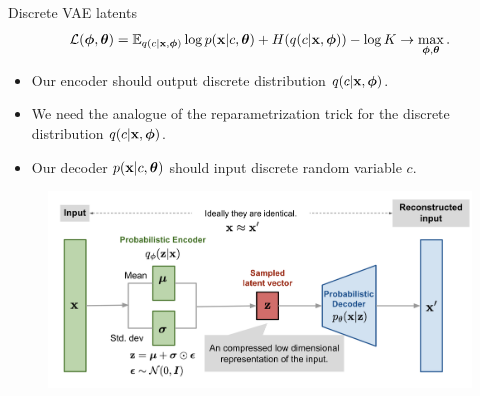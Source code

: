 \begin{frame}{Discrete VAE latents}
	\vspace{-0.3cm}
	\[
		\mathcal{L} (\boldsymbol{\phi}, \boldsymbol{\theta})  = \mathbb{E}_{q(c | \mathbf{x}, \boldsymbol{\phi})} \log p(\mathbf{x} | c, \boldsymbol{\theta}) + H(q(c | \mathbf{x}, \boldsymbol{\phi})) - \log K \rightarrow \max_{\boldsymbol{\phi}, \boldsymbol{\theta}}.
	\]
	\vspace{-0.3cm}
	\begin{itemize}
		\item Our encoder should output discrete distribution $q(c | \mathbf{x}, \boldsymbol{\phi})$.
		\item We need the analogue of the reparametrization trick for the discrete distribution $q(c | \mathbf{x}, \boldsymbol{\phi})$.
		\item Our decoder $p(\mathbf{x} | c, \boldsymbol{\theta})$ should input discrete random variable $c$.
	\end{itemize}
	\begin{figure}[h]
		\centering
		\includegraphics[width=0.9\linewidth]{figs/vae-gaussian}
	\end{figure}
\end{frame}
